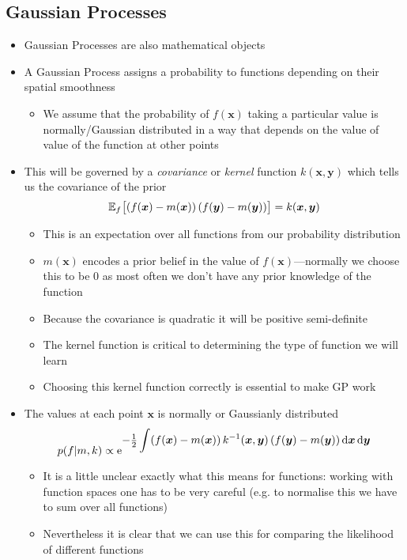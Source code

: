 \documentclass[11pt]{article}
\newcommand{\av}[2][]{\mathbb{E}_{#1\!}\left[ #2 \right]}
\newcommand{\E}[1]{{\rm e}^{\displaystyle #1}}
\newcommand{\dd}{\mathrm{d}}
\begin{document}
\subsection{Gaussian Processes}
\label{sec:orgab9785b}
\begin{itemize}
\item Gaussian Processes are also mathematical objects
\item A Gaussian Process assigns a  probability to functions
depending on their spatial smoothness
\begin{itemize}
\item We assume that the probability of \(f(\bm{x})\) taking a
particular value is normally/Gaussian distributed in a way that
depends on the value of  value of the function at other points
\end{itemize}
\item This will be governed by a \emph{covariance} or \emph{kernel} function
\(k(\bm{x},\bm{y})\)  which tells us the covariance of the prior
$$ \av[f]{ (f(\bm{x})-m(\bm{x})) \, (f(\bm{y})-m(\bm{y}))\strut } =
     k(\bm{x},\bm{y}) $$
\begin{itemize}
\item This is an expectation over all functions from our probability distribution
\item \(m(\bm{x})\) encodes a prior belief in the value of
\(f(\bm{x})\)---normally we choose this to be 0 as most often
we don't have any prior knowledge of the function
\item Because the covariance is quadratic it will be positive semi-definite
\item The kernel function is critical to determining the type of
function we will learn
\item Choosing this kernel function correctly is essential to make GP work
\end{itemize}
\item The values at each point \(\bm{x}\) is normally or Gaussianly
distributed
$$ p(f|m,k) \propto \E{-\tfrac{1}{2} \int (f(\bm{x})-m(\bm{x})) 
      \, k^{-1}(\bm{x},\bm{y}) \, (f(\bm{y}) -m(\bm{y})) \, \dd \bm{x}
      \, \dd \bm{y}} $$
\begin{itemize}
\item It is a little unclear exactly what this means for functions: working
with function spaces one has to be very careful (e.g. to
normalise this we have to sum over all functions)
\item Nevertheless it is clear that we can use this for comparing the
likelihood of different functions

\end{itemize}
\end{itemize}
\end{document}
